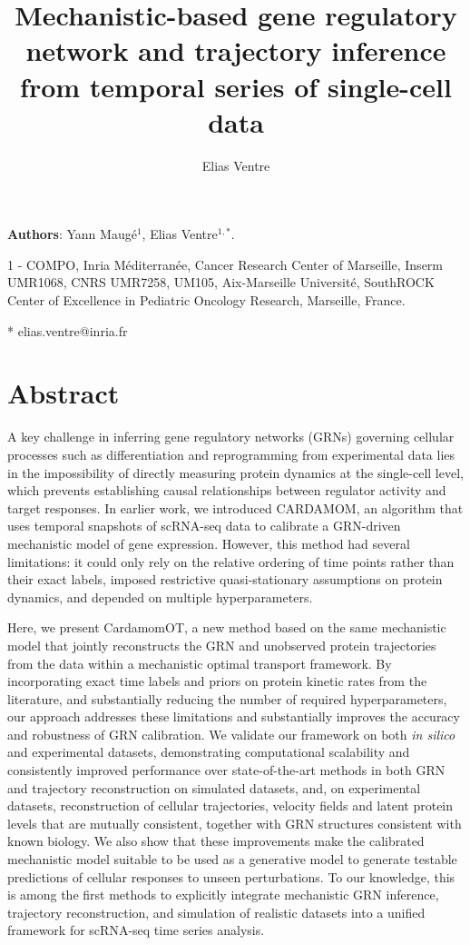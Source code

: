 \documentclass[a4paper, 11pt]{article}
\title{Mechanistic-based gene regulatory network and trajectory inference from temporal series of single-cell data}
\author{Elias Ventre}
\theoremstyle{plain}
\theoremstyle{remark}
\newcommand*{\firstreview}[1]{{\color{black}#1}}
\begin{document}
\setlength\parindent{0pt}
\begin{center}
\end{center}
    \vspace{.5cm}
\noindent \textbf{Authors}: Yann Maugé$^{1}$, Elias Ventre$^{1,*}$.\par
1 - COMPO, Inria Méditerranée, Cancer Research Center of Marseille, Inserm UMR1068, CNRS UMR7258, UM105, Aix-Marseille Université, SouthROCK Center of Excellence in Pediatric Oncology Research, Marseille, France.
\par
* elias.ventre@inria.fr

\linenumbers
\section*{Abstract}
A key challenge in inferring gene regulatory networks (GRNs) governing cellular processes such as differentiation and reprogramming from experimental data lies in the impossibility of directly measuring protein dynamics at the single-cell level, which prevents establishing causal relationships between regulator activity and target responses. In earlier work, we introduced CARDAMOM, an algorithm that uses temporal snapshots of scRNA-seq data to calibrate a GRN-driven mechanistic model of gene expression. However, this method had several limitations: it could only rely on the relative ordering of time points rather than their exact labels, imposed restrictive quasi-stationary assumptions on protein dynamics, and depended on multiple hyperparameters.

Here, we present CardamomOT, a new method based on the same mechanistic model that jointly reconstructs the GRN and unobserved protein trajectories from the data within a mechanistic optimal transport framework. By incorporating exact time labels and priors on protein kinetic rates from the literature, and substantially reducing the number of required hyperparameters, our approach addresses these limitations and substantially improves the accuracy and robustness of GRN calibration. We validate our framework on both \textit{in silico} and experimental datasets, demonstrating computational scalability and consistently improved performance over state-of-the-art methods in both GRN and trajectory reconstruction \firstreview{on simulated datasets, and, on experimental datasets, reconstruction of cellular trajectories, velocity fields and latent protein levels that are mutually consistent, together with GRN structures consistent with known biology}. We also show that these improvements make the calibrated mechanistic model suitable to be used as a generative model to generate testable predictions of cellular responses to unseen perturbations. To our knowledge, this is among the first methods to explicitly integrate mechanistic GRN inference, trajectory reconstruction, and simulation of realistic datasets into a unified framework for scRNA-seq time series analysis.
\end{document}

